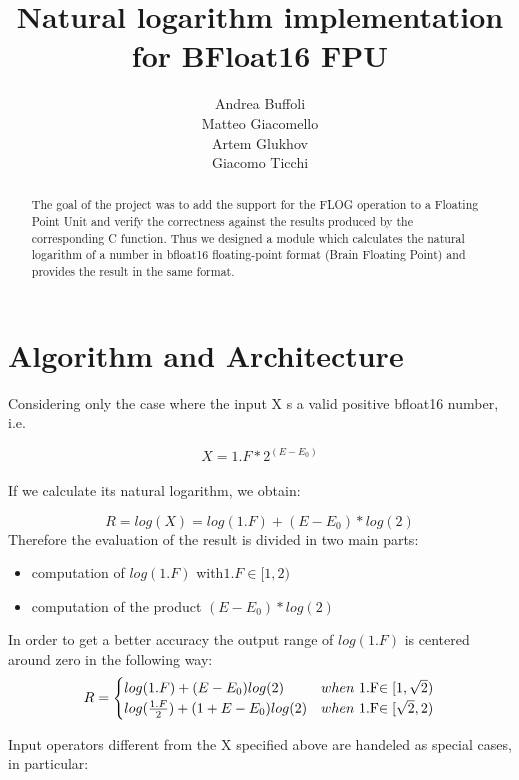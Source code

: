 \documentclass{report}
\title{Natural logarithm implementation for BFloat16 FPU}
\author{
Andrea Buffoli\\
Matteo Giacomello\\
Artem Glukhov\\
Giacomo Ticchi
}
\begin{document}
\maketitle
\begin{abstract}
The goal of the project was to add the support for the FLOG operation to a Floating Point Unit and verify the correctness against the results produced by the corresponding C function.
Thus we designed a module which calculates the natural logarithm of a number in bfloat16 floating-point format (Brain Floating Point) and provides the result in the same format. 

\end{abstract}

\chapter{Algorithm and Architecture}
Considering only the case where the input X s a valid positive bfloat16 number, i.e.

$$X=1.F*2^{(E-E_0)}$$
\\If we calculate its natural logarithm, we obtain:

$$R = log(X) = log(1.F)+(E-E_0)*log(2)$$
Therefore the evaluation of the result is divided in two main parts:
\begin{itemize}
\item computation of $log(1.F)$ with$ 1.F \in [1,2)$
\item computation of the product $(E-E_0)*log(2)$
\end{itemize}
In order to get a better accuracy the output range of $log(1.F)$ is centered around zero in the following way:
\[
R=
\begin{cases}
        log(1.F)+(E-E_0)log(2)  & when  $ 1.F$ \in[1,\sqrt{2})\\
        log(\frac{1.F}{2})+(1+E-E_0)log(2) & when  $ 1.F$ \in[\sqrt{2},2)
\end{cases}
\]

Input operators different from the X specified above are handeled as special cases, in particular:
\end{document}
